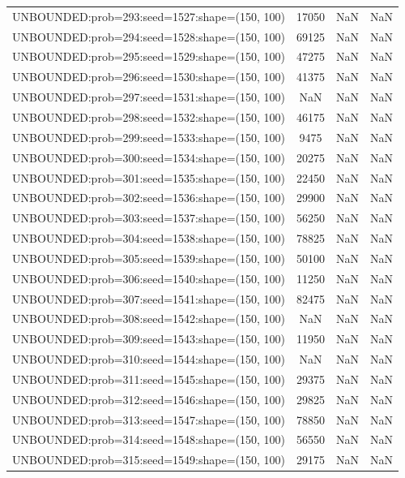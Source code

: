 \begin{longtable}{lccc}
UNBOUNDED:prob=293:seed=1527:shape=(150, 100) & 17050 &   NaN &    NaN \\
UNBOUNDED:prob=294:seed=1528:shape=(150, 100) & 69125 &   NaN &    NaN \\
UNBOUNDED:prob=295:seed=1529:shape=(150, 100) & 47275 &   NaN &    NaN \\
UNBOUNDED:prob=296:seed=1530:shape=(150, 100) & 41375 &   NaN &    NaN \\
UNBOUNDED:prob=297:seed=1531:shape=(150, 100) &   NaN &   NaN &    NaN \\
UNBOUNDED:prob=298:seed=1532:shape=(150, 100) & 46175 &   NaN &    NaN \\
UNBOUNDED:prob=299:seed=1533:shape=(150, 100) &  9475 &   NaN &    NaN \\
UNBOUNDED:prob=300:seed=1534:shape=(150, 100) & 20275 &   NaN &    NaN \\
UNBOUNDED:prob=301:seed=1535:shape=(150, 100) & 22450 &   NaN &    NaN \\
UNBOUNDED:prob=302:seed=1536:shape=(150, 100) & 29900 &   NaN &    NaN \\
UNBOUNDED:prob=303:seed=1537:shape=(150, 100) & 56250 &   NaN &    NaN \\
UNBOUNDED:prob=304:seed=1538:shape=(150, 100) & 78825 &   NaN &    NaN \\
UNBOUNDED:prob=305:seed=1539:shape=(150, 100) & 50100 &   NaN &    NaN \\
UNBOUNDED:prob=306:seed=1540:shape=(150, 100) & 11250 &   NaN &    NaN \\
UNBOUNDED:prob=307:seed=1541:shape=(150, 100) & 82475 &   NaN &    NaN \\
UNBOUNDED:prob=308:seed=1542:shape=(150, 100) &   NaN &   NaN &    NaN \\
UNBOUNDED:prob=309:seed=1543:shape=(150, 100) & 11950 &   NaN &    NaN \\
UNBOUNDED:prob=310:seed=1544:shape=(150, 100) &   NaN &   NaN &    NaN \\
UNBOUNDED:prob=311:seed=1545:shape=(150, 100) & 29375 &   NaN &    NaN \\
UNBOUNDED:prob=312:seed=1546:shape=(150, 100) & 29825 &   NaN &    NaN \\
UNBOUNDED:prob=313:seed=1547:shape=(150, 100) & 78850 &   NaN &    NaN \\
UNBOUNDED:prob=314:seed=1548:shape=(150, 100) & 56550 &   NaN &    NaN \\
UNBOUNDED:prob=315:seed=1549:shape=(150, 100) & 29175 &   NaN &    NaN \\

\end{longtable}
